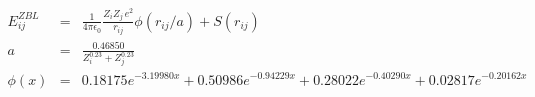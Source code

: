 \documentclass[12pt]{article}
\begin{document}
\begin{eqnarray*}
  E^{ZBL}_{ij} & = & \frac{1}{4\pi\epsilon_0} \frac{Z_i Z_j \,e^2}{r_{ij}} \phi(r_{ij}/a)+ S(r_{ij})\\
  a & = & \frac{0.46850}{Z_{i}^{0.23} + Z_{j}^{0.23}}\\
  \phi(x) & = & 0.18175e^{-3.19980x} + 0.50986e^{-0.94229x} + 0.28022e^{-0.40290x} + 0.02817e^{-0.20162x}\\
 \end{eqnarray*}                           
\end{document}
